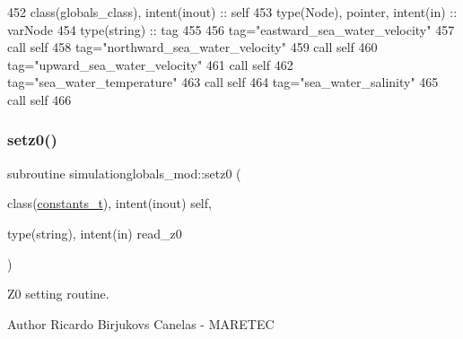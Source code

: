 \begin{DoxyCode}
452     \textcolor{keywordtype}{class}(globals\_class), \textcolor{keywordtype}{intent(inout)} :: self
453     \textcolor{keywordtype}{type}(Node), \textcolor{keywordtype}{pointer}, \textcolor{keywordtype}{intent(in)} :: varNode
454     \textcolor{keywordtype}{type}(string) :: tag
455 
456     tag=\textcolor{stringliteral}{"eastward\_sea\_water\_velocity"}
457     \textcolor{keyword}{call }self%
458     tag=\textcolor{stringliteral}{"northward\_sea\_water\_velocity"}
459     \textcolor{keyword}{call }self%
460     tag=\textcolor{stringliteral}{"upward\_sea\_water\_velocity"}
461     \textcolor{keyword}{call }self%
462     tag=\textcolor{stringliteral}{"sea\_water\_temperature"}
463     \textcolor{keyword}{call }self%
464     tag=\textcolor{stringliteral}{"sea\_water\_salinity"}
465     \textcolor{keyword}{call }self%
466 
\end{DoxyCode}
\mbox{\label{namespacesimulationglobals__mod_a36c2833caae3767434115cc966fe2c5d}} 
\subsubsection{\texorpdfstring{setz0()}{setz0()}}
{\footnotesize\ttfamily subroutine simulationglobals\+\_\+mod\+::setz0 (\begin{DoxyParamCaption}\item[{class(\mbox{\hyperlink{structsimulationglobals__mod_1_1constants__t}{constants\+\_\+t}}), intent(inout)}]{self,  }\item[{type(string), intent(in)}]{read\+\_\+z0 }\end{DoxyParamCaption})\hspace{0.3cm}{\ttfamily [private]}}



Z0 setting routine. 

\begin{DoxyAuthor}{Author}
Ricardo Birjukovs Canelas -\/ M\+A\+R\+E\+T\+EC 
\end{DoxyAuthor}

